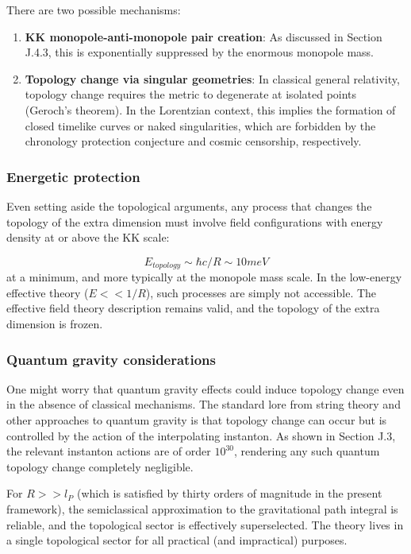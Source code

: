 \documentclass[aps,prd,preprint,superscriptaddress,longbibliography,floatfix]{revtex4-2}
\theoremstyle{remark}
\begin{document}
There are two possible mechanisms:


\begin{enumerate}
  \item \textbf{KK monopole-anti-monopole pair creation}: As discussed in Section J.4.3, this is exponentially suppressed by the enormous monopole mass.
  \item \textbf{Topology change via singular geometries}: In classical general relativity, topology change requires the metric to degenerate at isolated points (Geroch's theorem). In the Lorentzian context, this implies the formation of closed timelike curves or naked singularities, which are forbidden by the chronology protection conjecture and cosmic censorship, respectively.
\end{enumerate}


\subsubsection{Energetic protection}

Even setting aside the topological arguments, any process that changes the topology of the extra dimension must involve field configurations with energy density at or above the KK scale:


\begin{equation}
    E_{topology} \sim  \hbar c / R \sim  10 meV
\end{equation}
at a minimum, and more typically at the monopole mass scale. In the low-energy effective theory ($E << 1/R$), such processes are simply not accessible. The effective field theory description remains valid, and the topology of the extra dimension is frozen.


\subsubsection{Quantum gravity considerations}

One might worry that quantum gravity effects could induce topology change even in the absence of classical mechanisms. The standard lore from string theory and other approaches to quantum gravity is that topology change can occur but is controlled by the action of the interpolating instanton. As shown in Section J.3, the relevant instanton actions are of order $10^{30}$, rendering any such quantum topology change completely negligible.

For $R >> l_P$ (which is satisfied by thirty orders of magnitude in the present framework), the semiclassical approximation to the gravitational path integral is reliable, and the topological sector is effectively superselected. The theory lives in a single topological sector for all practical (and impractical) purposes.
\end{document}
